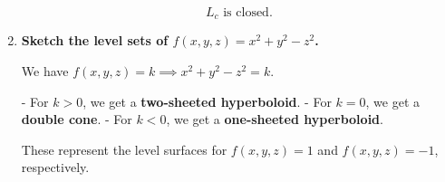 \documentclass[14pt]{extarticle}
\begin{document}
\begin{enumerate}
\[
\boxed{L_c \text{ is closed.}}
\]

\newpage

\item \textbf{Sketch the level sets of $f(x,y,z)=x^2+y^2-z^2$.}

We have $f(x,y,z)=k \implies x^2+y^2-z^2=k$.

- For $k>0$, we get a \textbf{two-sheeted hyperboloid}.
- For $k=0$, we get a \textbf{double cone}.
- For $k<0$, we get a \textbf{one-sheeted hyperboloid}.

\begin{center}
\end{center}

These represent the level surfaces for $f(x,y,z)=1$ and $f(x,y,z)=-1$, respectively.

\end{enumerate}
\end{document}
